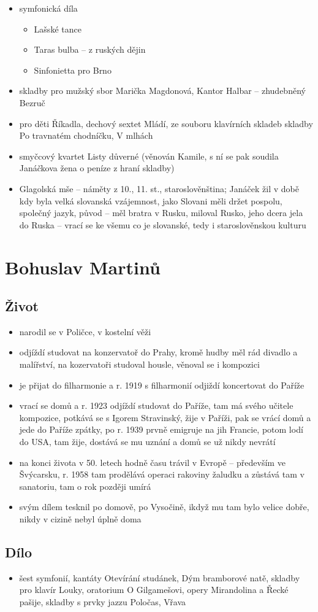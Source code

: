 \documentclass{article}
\begin{document}
\begin{itemize}
  \item symfonická díla
  \begin{itemize}
    \item Lašské tance
    \item Taras bulba -- z ruských dějin
    \item Sinfonietta pro Brno
  \end{itemize}
  \item skladby pro mužský sbor Marička Magdonová, Kantor Halbar -- zhudebněný Bezruč
  \item pro děti Říkadla, dechový sextet Mládí, ze souboru klavírních skladeb skladby Po travnatém chodníčku, V mlhách
  \item smyčcový kvartet Listy důverné (věnován Kamile, s ní se pak soudila Janáčkova žena o peníze z hraní skladby)
  \item Glagolská mše -- náměty z 10., 11. st., staroslověnština; Janáček žil v době kdy byla velká slovanská vzájemnost, jako Slovani měli držet pospolu, společný jazyk, původ -- měl bratra v Rusku, miloval Rusko, jeho dcera jela do Ruska -- vrací se ke všemu co je slovanské, tedy i staroslověnskou kulturu
\end{itemize}

\section{Bohuslav Martinů}
\subsection{Život}
\begin{itemize}
  \item narodil se v Poličce, v kostelní věži
  \item odjíždí studovat na konzervatoř do Prahy, kromě hudby měl rád divadlo a malířství, na kozervatoři studoval housle, věnoval se i kompozici
  \item je přijat do filharmonie a r. 1919 s filharmonií odjiždí koncertovat do Paříže
  \item vrací se domů a r. 1923 odjíždí studovat do Paříže, tam má svého učitele kompozice, potkává se s Igorem Stravinský, žije v Paříži, pak se vrácí domů a jede do Paříže zpátky, po r. 1939 prvně emigruje na jih Francie, potom lodí do USA, tam žije, dostává se mu uznání a domů se už nikdy nevrátí
  \item na konci života v 50. letech hodně času trávil v Evropě -- především ve Švýcarsku, r. 1958 tam prodělává operaci rakoviny žaludku a zůstává tam v sanatoriu, tam o rok později umírá
  \item svým dílem tesknil po domově, po Vysočině, ikdyž mu tam bylo velice dobře, nikdy v cizině nebyl úplně doma
\end{itemize}
\subsection{Dílo}
\begin{itemize}
  \item šest symfonií, kantáty Otevírání studánek, Dým bramborové natě, skladby pro klavír Louky, oratorium O Gilgamešovi, opery Mirandolina a Řecké pašije, skladby s prvky jazzu Poločas, Vřava
\end{itemize}
\end{document}

